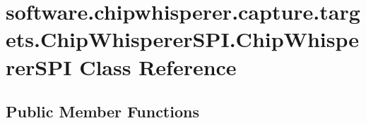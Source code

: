 \hypertarget{classsoftware_1_1chipwhisperer_1_1capture_1_1targets_1_1ChipWhispererSPI_1_1ChipWhispererSPI}{}\section{software.\+chipwhisperer.\+capture.\+targets.\+Chip\+Whisperer\+S\+P\+I.\+Chip\+Whisperer\+S\+P\+I Class Reference}
\label{classsoftware_1_1chipwhisperer_1_1capture_1_1targets_1_1ChipWhispererSPI_1_1ChipWhispererSPI}
\subsection*{Public Member Functions}
